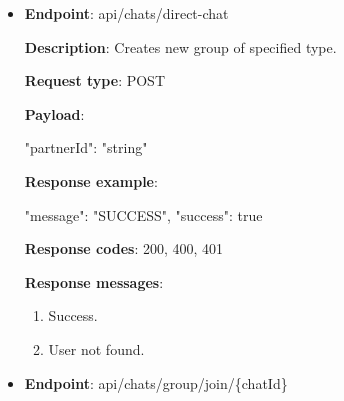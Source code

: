 \begin{itemize}
    \textbf{Request type}: POST

    \textbf{Payload}:

    \begin{spverbatim}
    {
        "groupType": integer,
        "groupTitle": "string"
    }
    \end{spverbatim}

    \textbf{Response example}:

    \begin{spverbatim}
    {
        "message": "SUCCESS",
        "success": true
    }
    \end{spverbatim}

    \textbf{Response codes}: 200, 400, 401

    \textbf{Response messages}:
    \begin{enumerate}
        \item Success.
        \item User not found.
    \end{enumerate}

    \item \textbf{Endpoint}: api/chats/direct-chat

    \textbf{Description}: Creates new group of specified type.

    \textbf{Request type}: POST

    \textbf{Payload}:

    \begin{spverbatim}
    {
        "partnerId": "string"
    }
    \end{spverbatim}

    \textbf{Response example}:

    \begin{spverbatim}
    {
        "message": "SUCCESS",
        "success": true
    }
    \end{spverbatim}

    \textbf{Response codes}: 200, 400, 401

    \textbf{Response messages}:
    \begin{enumerate}
        \item Success.
        \item User not found.
    \end{enumerate}

    \item \textbf{Endpoint}: api/chats/group/join/\{chatId\}


\end{itemize}
